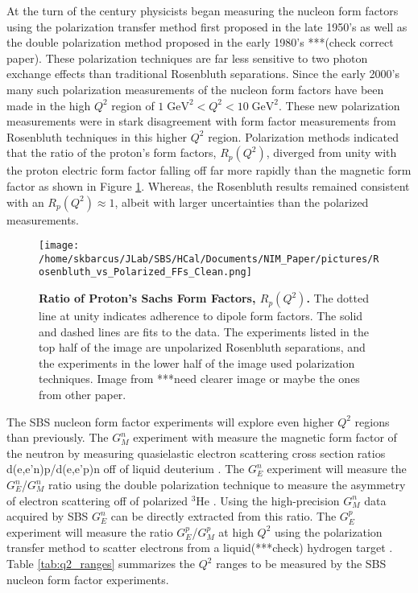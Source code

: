 \documentclass[oneside]{book}   %
\newcommand{\q}{$Q^2$\xspace}
\begin{document}
At the turn of the century physicists began measuring the nucleon form factors using the polarization transfer method first proposed in the late 1950's \cite{polarization_transfer} as well as the double polarization method proposed in the early 1980's \cite{double_polarization} ***(check correct paper). These polarization techniques are far less sensitive to two photon exchange effects than traditional Rosenbluth separations. Since the early 2000's many such polarization measurements of the nucleon form factors have been made in the high \q region of $1\; \text{GeV}^2 < Q^2 < 10\; \text{GeV}^2$. These new polarization measurements were in stark disagreement with form factor measurements from Rosenbluth techniques in this higher \q region. Polarization methods indicated that the ratio of the proton's form factors, $R_p(Q^2)$, diverged from unity with the proton electric form factor falling off far more rapidly than the magnetic form factor as shown in Figure \ref{fig:polarization_vs_rosenbluth}. Whereas, the Rosenbluth results remained consistent with an $R_p(Q^2) \approx 1$, albeit with larger uncertainties than the polarized measurements.\\

	\begin{figure}[!ht]
	\begin{center}
	\texttt{[image: /home/skbarcus/JLab/SBS/HCal/Documents/NIM\_Paper/pictures/Rosenbluth\_vs\_Polarized\_FFs\_Clean.png]}
	\end{center}
	\caption{
	{\bf{Ratio of Proton's Sachs Form Factors, $R_p(Q^2)$.}} The dotted line at unity indicates adherence to dipole form factors. The solid and dashed lines are fits to the data. The experiments listed in the top half of the image are unpolarized Rosenbluth separations, and the experiments in the lower half of the image used polarization techniques. Image from \cite{cisbani_2014}***need clearer image or maybe the ones from other paper.}
	\label{fig:polarization_vs_rosenbluth}
	\end{figure}	

The SBS nucleon form factor experiments will explore even higher \q regions than previously. The $G_M^n$ experiment with measure the magnetic form factor of the neutron by measuring quasielastic electron scattering cross section ratios d(e,e'n)p/d(e,e'p)n off of liquid deuterium \cite{gmn_proposal}. The $G_E^n$ experiment will measure the $G_E^n$/$G_M^n$ ratio using the double polarization technique to measure the asymmetry of electron scattering off of polarized $^3$He \cite{gen_proposal}. Using the high-precision $G_M^n$ data acquired by SBS $G_E^n$ can be directly extracted from this ratio. The $G_E^p$ experiment will measure the ratio $G_E^p$/$G_M^p$ at high \q using the polarization transfer method to scatter electrons from a liquid(***check) hydrogen target \cite{gep_proposal}. Table \ref{tab:q2_ranges} summarizes the \q ranges to be measured by the SBS nucleon form factor experiments.\\ 
\end{document}
